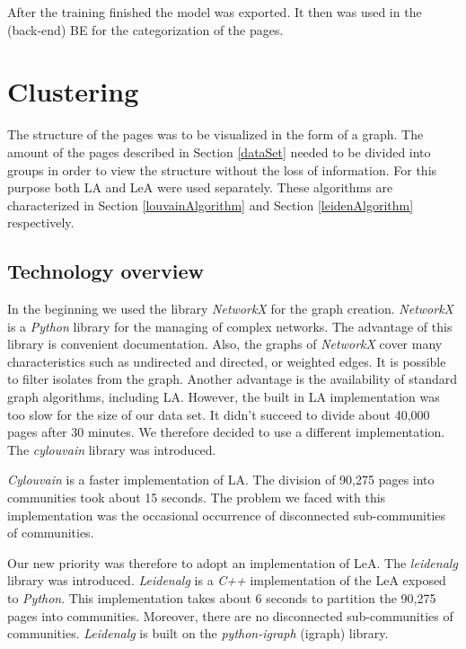 After the training finished the model was exported. It then was used in the (back-end) BE for the categorization of the pages.




\section{Clustering}\label{ClusteringDevelopment}
The structure of the pages was to be visualized in the form of a graph. The amount of the pages described in Section \ref{dataSet} needed to be divided into groups in order to view the structure without the loss of information. For this purpose both LA and LeA were used separately. These algorithms are characterized in Section \ref{louvainAlgorithm} and Section \ref{leidenAlgorithm} respectively. 

\subsection{Technology overview} \label{ClusteringTechonologyOverview}
In the beginning we used the library \textit{NetworkX} \cite{networkX} for the graph creation. \textit{NetworkX} is a \textit{Python} library for the managing of complex networks. The advantage of this library is convenient documentation. Also, the graphs of \textit{NetworkX} cover many characteristics such as undirected and directed, or weighted edges. It is possible to filter isolates from the graph.  Another advantage is the availability of standard graph algorithms, including LA. However, the built in LA implementation was too slow for the size of our data set. It didn't succeed to divide about 40,000 pages after 30 minutes. We therefore decided to use a different implementation. The \textit{cylouvain} library \cite{cylouvain} was introduced. 

\textit{Cylouvain} is a faster implementation of LA. The division of 90,275 pages into communities took about 15 seconds. The problem we faced with this implementation was the occasional occurrence of disconnected sub-communities of communities. 

Our new priority was therefore to adopt an implementation of LeA. The \textit{leidenalg} \cite{leidenalg} library was introduced. \textit{Leidenalg} is a \textit{C++} implementation of the LeA exposed to \textit{Python}. This implementation takes about 6 seconds to partition the 90,275 pages into communities. Moreover, there are no disconnected sub-communities of communities. \textit{Leidenalg} is built on the \textit{python-igraph} (igraph) library. 

